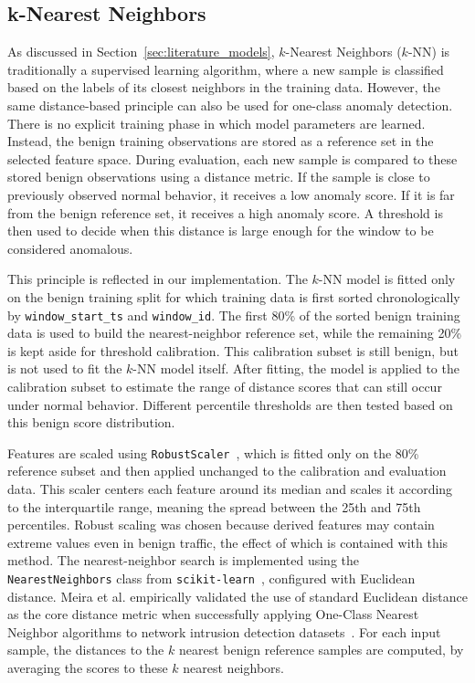\subsection{k-Nearest Neighbors}
\label{sec:knn_method}

As discussed in Section~\ref{sec:literature_models}, $k$-Nearest Neighbors ($k$-NN) is traditionally a supervised learning algorithm, where a new sample is classified based on the labels of its closest neighbors in the training data. However, the same distance-based principle can also be used for one-class anomaly detection. There is no explicit training phase in which model parameters are learned. Instead, the benign training observations are stored as a reference set in the selected feature space. During evaluation, each new sample is compared to these stored benign observations using a distance metric. If the sample is close to previously observed normal behavior, it receives a low anomaly score. If it is far from the benign reference set, it receives a high anomaly score. A threshold is then used to decide when this distance is large enough for the window to be considered anomalous.

This principle is reflected in our implementation. The $k$-NN model is fitted only on the benign training split for which training data is first sorted chronologically by \texttt{window\_start\_ts} and \texttt{window\_id}. The first 80\% of the sorted benign training data is used to build the nearest-neighbor reference set, while the remaining 20\% is kept aside for threshold calibration. This calibration subset is still benign, but is not used to fit the $k$-NN model itself. After fitting, the model is applied to the calibration subset to estimate the range of distance scores that can still occur under normal behavior. Different percentile thresholds are then tested based on this benign score distribution.

Features are scaled using \texttt{RobustScaler}~\cite{pedregosa_scikit-learn_nodate}, which is fitted only on the 80\% reference subset and then applied unchanged to the calibration and evaluation data. This scaler centers each feature around its median and scales it according to the interquartile range, meaning the spread between the 25th and 75th percentiles. Robust scaling was chosen because derived features may contain extreme values even in benign traffic, the effect of which is contained with this method. The nearest-neighbor search is implemented using the \texttt{NearestNeighbors} class from \texttt{scikit-learn}~\cite{pedregosa_scikit-learn_nodate}, configured with Euclidean distance. Meira et al. empirically validated the use of standard Euclidean distance as the core distance metric when successfully applying One-Class Nearest Neighbor algorithms to network intrusion detection datasets~\cite{meira_performance_2020}. For each input sample, the distances to the $k$ nearest benign reference samples are computed, by averaging the scores to these $k$ nearest neighbors.
